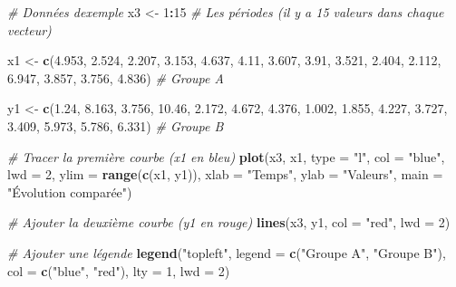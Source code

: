 \documentclass[
  12pt,
]{article}
\newenvironment{Shaded}{\begin{snugshade}}{\end{snugshade}}
\newcommand{\AttributeTok}[1]{\textcolor[rgb]{0.13,0.29,0.53}{#1}}
\newcommand{\CommentTok}[1]{\textcolor[rgb]{0.56,0.35,0.01}{\textit{#1}}}
\newcommand{\DecValTok}[1]{\textcolor[rgb]{0.00,0.00,0.81}{#1}}
\newcommand{\FloatTok}[1]{\textcolor[rgb]{0.00,0.00,0.81}{#1}}
\newcommand{\FunctionTok}[1]{\textcolor[rgb]{0.13,0.29,0.53}{\textbf{#1}}}
\newcommand{\NormalTok}[1]{#1}
\newcommand{\OtherTok}[1]{\textcolor[rgb]{0.56,0.35,0.01}{#1}}
\newcommand{\SpecialCharTok}[1]{\textcolor[rgb]{0.81,0.36,0.00}{\textbf{#1}}}
\newcommand{\StringTok}[1]{\textcolor[rgb]{0.31,0.60,0.02}{#1}}
\begin{document}
\begin{Shaded}
\begin{Highlighting}[]
\CommentTok{\# Données d\textquotesingle{}exemple}
\NormalTok{x3 }\OtherTok{\textless{}{-}} \DecValTok{1}\SpecialCharTok{:}\DecValTok{15}  \CommentTok{\# Les périodes (il y a 15 valeurs dans chaque vecteur)}

\NormalTok{x1 }\OtherTok{\textless{}{-}} \FunctionTok{c}\NormalTok{(}\FloatTok{4.953}\NormalTok{, }\FloatTok{2.524}\NormalTok{, }\FloatTok{2.207}\NormalTok{, }\FloatTok{3.153}\NormalTok{, }\FloatTok{4.637}\NormalTok{, }\FloatTok{4.11}\NormalTok{, }\FloatTok{3.607}\NormalTok{, }\FloatTok{3.91}\NormalTok{, }\FloatTok{3.521}\NormalTok{,  }
        \FloatTok{2.404}\NormalTok{, }\FloatTok{2.112}\NormalTok{, }\FloatTok{6.947}\NormalTok{, }\FloatTok{3.857}\NormalTok{, }\FloatTok{3.756}\NormalTok{, }\FloatTok{4.836}\NormalTok{)  }\CommentTok{\# Groupe A}

\NormalTok{y1 }\OtherTok{\textless{}{-}} \FunctionTok{c}\NormalTok{(}\FloatTok{1.24}\NormalTok{, }\FloatTok{8.163}\NormalTok{, }\FloatTok{3.756}\NormalTok{, }\FloatTok{10.46}\NormalTok{, }\FloatTok{2.172}\NormalTok{, }\FloatTok{4.672}\NormalTok{, }\FloatTok{4.376}\NormalTok{, }\FloatTok{1.002}\NormalTok{, }\FloatTok{1.855}\NormalTok{, }
        \FloatTok{4.227}\NormalTok{, }\FloatTok{3.727}\NormalTok{, }\FloatTok{3.409}\NormalTok{, }\FloatTok{5.973}\NormalTok{, }\FloatTok{5.786}\NormalTok{, }\FloatTok{6.331}\NormalTok{)  }\CommentTok{\# Groupe B}

\CommentTok{\# Tracer la première courbe (x1 en bleu)}
\FunctionTok{plot}\NormalTok{(x3, x1, }\AttributeTok{type =} \StringTok{"l"}\NormalTok{, }\AttributeTok{col =} \StringTok{"blue"}\NormalTok{, }\AttributeTok{lwd =} \DecValTok{2}\NormalTok{, }\AttributeTok{ylim =} \FunctionTok{range}\NormalTok{(}\FunctionTok{c}\NormalTok{(x1, y1)),}
     \AttributeTok{xlab =} \StringTok{"Temps"}\NormalTok{, }\AttributeTok{ylab =} \StringTok{"Valeurs"}\NormalTok{, }\AttributeTok{main =} \StringTok{"Évolution comparée"}\NormalTok{)}

\CommentTok{\# Ajouter la deuxième courbe (y1 en rouge)}
\FunctionTok{lines}\NormalTok{(x3, y1, }\AttributeTok{col =} \StringTok{"red"}\NormalTok{, }\AttributeTok{lwd =} \DecValTok{2}\NormalTok{)}

\CommentTok{\# Ajouter une légende}
\FunctionTok{legend}\NormalTok{(}\StringTok{"topleft"}\NormalTok{, }\AttributeTok{legend =} \FunctionTok{c}\NormalTok{(}\StringTok{"Groupe A"}\NormalTok{, }\StringTok{"Groupe B"}\NormalTok{),}
       \AttributeTok{col =} \FunctionTok{c}\NormalTok{(}\StringTok{"blue"}\NormalTok{, }\StringTok{"red"}\NormalTok{), }\AttributeTok{lty =} \DecValTok{1}\NormalTok{, }\AttributeTok{lwd =} \DecValTok{2}\NormalTok{)}
\end{Highlighting}
\end{Shaded}
\end{document}
